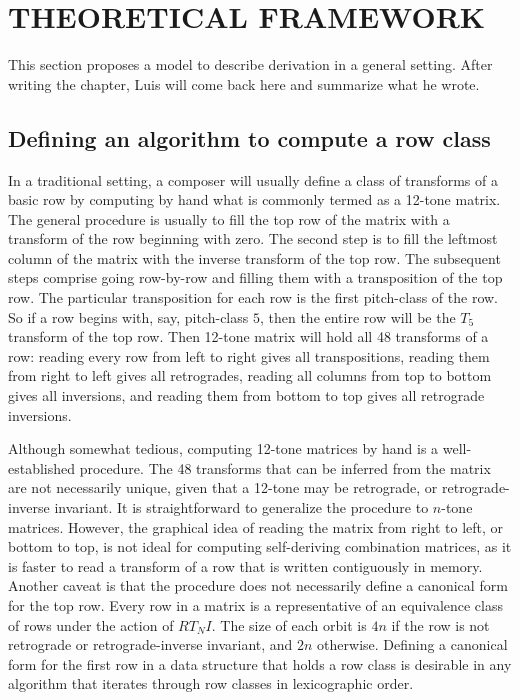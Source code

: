 \chapter{THEORETICAL FRAMEWORK}

This section proposes a model to describe derivation in a general setting. After writing the chapter, Luis will come back here and summarize what he wrote.


\section{Defining an algorithm to compute a row class}

In a traditional setting, a composer will usually define a class of transforms of a basic row by computing by hand what is commonly termed as a 12-tone matrix. The general procedure is usually to fill the top row of the matrix with a transform of the row beginning with zero. The second step is to fill the leftmost column of the matrix with the inverse transform of the top row. The subsequent steps comprise going row-by-row and filling them with a transposition of the top row. The particular transposition for each row is the first pitch-class of the row. So if a row begins with, say, pitch-class $5$, then the entire row will be the $T_5$ transform of the top row. Then 12-tone matrix will hold all 48 transforms of a row: reading every row from left to right gives all transpositions, reading them from right to left gives all retrogrades, reading all columns from top to bottom gives all inversions, and reading them from bottom to top gives all retrograde inversions.

Although somewhat tedious, computing 12-tone matrices by hand is a well-established procedure. The 48 transforms that can be inferred from the matrix are not necessarily unique, given that a 12-tone may be retrograde, or retrograde-inverse invariant. It is straightforward to generalize the procedure to $n$-tone matrices. However, the graphical idea of reading the matrix from right to left, or bottom to top, is not ideal for computing self-deriving combination matrices, as it is faster to read a transform of a row that is written contiguously in memory. Another caveat is that the procedure does not necessarily define a canonical form for the top row. Every row in a matrix is a representative of an equivalence class of rows under the action of $RT_NI$. The size of each orbit is $4n$ if the row is not retrograde or retrograde-inverse invariant, and $2n$ otherwise. Defining a canonical form for the first row in a data structure that holds a row class is desirable in any algorithm that iterates through row classes in lexicographic order.

